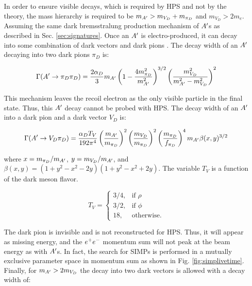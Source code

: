 In order to ensure visible decays, which is required by HPS and not by the theory, the mass hierarchy is required to be $m_{A^\prime}>m_{V_D}+m_{\pi_D}$ and $m_{V_D}>2m_e$. Assuming the same dark bremsstralung production mechanism of $A^\prime$s as described in Sec. \ref{sec:signatures}. Once an $A^\prime$ is electro-produced, it can decay into some combination of dark vectors and dark pions \cite{Hochberg2016}. The decay width of an $A^\prime$ decaying into two dark pions $\pi_D$ is:

\begin{equation}
    \Gamma (A^\prime \rightarrow \pi_D \pi_D)  = \frac{2 \alpha_{D}}{3} m_{A^\prime} \left( 1-\frac{4 m^2_{\pi_D}}{m_{A^\prime}^2}\right)^{3/2} \left( \frac{m_{V_D}^2}{m_{A^\prime}^2-m^2_{V_D}}\right)^2
    \label{eqn:pipi}
\end{equation}

This mechanism leaves the recoil electron as the only visible particle in the final state. Thus, this $A^\prime$ decay cannot be probed with HPS. The decay width of an $A^\prime$ into a dark pion and a dark vector $V_D$ is:

\begin{equation}
    \Gamma (A^\prime \rightarrow V_D \pi_D)  = \frac{\alpha_D T_V}{192 \pi^4} \left( \frac{m_{A^\prime}}{m_{\pi_D}} \right)^2 \left( \frac{m_{V_D}}{m_{\pi_D}} \right)^2 \left( \frac{m_{\pi_D}}{f_{\pi_D}} \right)^4 m_{A^\prime} \beta (x,y)^{3/2}
    \label{eqn:Vpi}
\end{equation}

where $x=m_{\pi_D}/m_{A^\prime}$, $y=m_{V_D}/m_{A^\prime}$, and  $\beta(x,y)=(1+y^2-x^2-2y)(1+y^2-x^2+2y)$. The variable $T_V$ is a function of the dark meson flavor.

\begin{equation}
    T_V = \left\{
    \begin{array}{ll}
    3/4, & \mbox{if $\rho$} \\
    3/2, & \mbox{if $\phi$} \\
    18, & \mbox{otherwise}.
    \end{array}
    \label{eqn:Tv}
\end{equation}

The dark pion is invisible and is not reconstructed for HPS. Thus, it will appear as missing energy, and the $e^{+}e^{-}$ momentum sum will not peak at the beam energy as with $A^\prime$s. In fact, the search for SIMPs is performed in a mutually exclusive parameter space in momentum sum as shown in Fig. \ref{fig:simplivetime}. Finally, for $m_{A^\prime}>2m_{V_D}$ the decay into two dark vectors is allowed with a decay width of:

